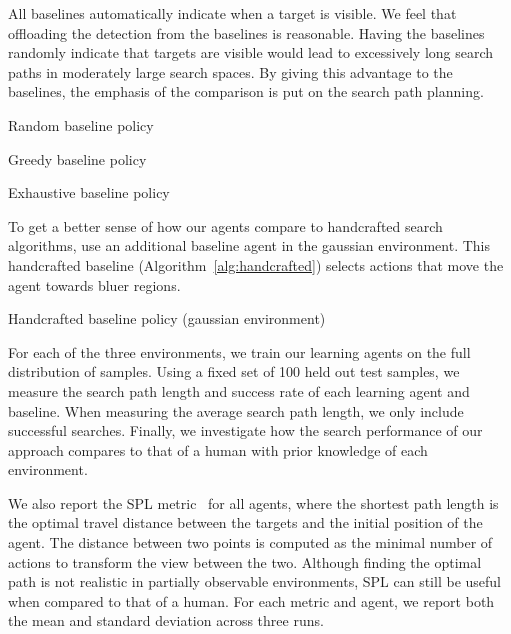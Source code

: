 All baselines automatically indicate when a target is visible.
We feel that offloading the detection from the baselines is reasonable.
Having the baselines randomly indicate that targets are visible would lead to excessively long search paths in moderately large search spaces.
By giving this advantage to the baselines, the emphasis of the comparison is put on the search path planning.

\begin{algorithm}
    \caption{Random baseline policy}
    \label{alg:random}
    
\end{algorithm}

\begin{algorithm}
    \caption{Greedy baseline policy}
    \label{alg:greedy}
    
\end{algorithm}

\begin{algorithm}
    \caption{Exhaustive baseline policy}
    \label{alg:exhaustive}
    
\end{algorithm}

To get a better sense of how our agents compare to handcrafted search algorithms, use an additional baseline agent in the gaussian environment.
This handcrafted baseline (Algorithm~\ref{alg:handcrafted}) selects actions that move the agent towards bluer regions.

\begin{algorithm}
    \caption{Handcrafted baseline policy (gaussian environment)}
    \label{alg:handcrafted}
    
\end{algorithm}

For each of the three environments, we train our learning agents on the full distribution of samples.
Using a fixed set of 100 held out test samples, we measure the search path length and success rate of each learning agent and baseline.
When measuring the average search path length, we only include successful searches.
Finally, we investigate how the search performance of our approach compares to that of a human with prior knowledge of each environment.

We also report the SPL metric~\cite{anderson_evaluation_2018} for all agents, where the shortest path length is the optimal travel distance between the targets and the initial position of the agent.
The distance between two points is computed as the minimal number of actions to transform the view between the two.
Although finding the optimal path is not realistic in partially observable environments, SPL can still be useful when compared to that of a human.
For each metric and agent, we report both the mean and standard deviation across three runs.

